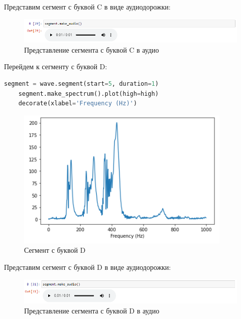 \documentclass[a4paper]{article}
\begin{document}
            Представим сегмент с буквой C в виде аудиодорожки:
            
            \begin{figure}[H]
                \centering
                \includegraphics[width=\textwidth]{ex_6_letter_c_audio.png}
                \caption{Представление сегмента с буквой C в аудио}
                \label{fig:ex_6_letter_c_audio}
            \end{figure}
            
             Перейдем к сегменту с буквой D:
            
\begin{lstlisting}[language=Python, caption= Сегмент с буквой D]
    segment = wave.segment(start=5, duration=1)
    segment.make_spectrum().plot(high=high)
    decorate(xlabel='Frequency (Hz)')
\end{lstlisting}   
            
             \begin{figure}[H]
                \centering
                \includegraphics{ex_6_letter_d_segment.png}
                \caption{Сегмент с буквой D}
                \label{fig:ex_6_letter_d_segment}
            \end{figure}
            
            Представим сегмент с буквой D в виде аудиодорожки:
            
            \begin{figure}[H]
                \centering
                \includegraphics[width=\textwidth]{ex_6_letter_d_audio.png}
                \caption{Представление сегмента с буквой D в аудио}
                \label{fig:ex_6_letter_d_audio}
            \end{figure}
            
\end{document}
